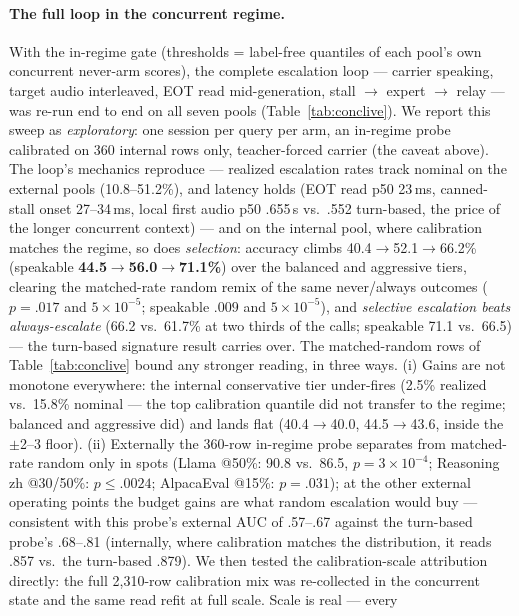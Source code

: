 \paragraph{The full loop in the concurrent regime.} With the
in-regime gate (thresholds = label-free quantiles of each pool's own
concurrent never-arm scores), the complete escalation loop --- carrier
speaking, target audio interleaved, EOT read mid-generation, stall $\to$
expert $\to$ relay --- was re-run end to end on all seven pools
(Table~\ref{tab:conclive}). We report this sweep as
\emph{exploratory}: one session per query per arm, an in-regime probe
calibrated on 360 internal rows only, teacher-forced carrier (the
caveat above). The loop's mechanics reproduce --- realized escalation
rates track nominal on the external pools (10.8--51.2\%), and latency
holds (EOT read p50 23\,ms, canned-stall onset 27--34\,ms, local
first audio p50 .655\,s vs.\ .552 turn-based, the price of the longer
concurrent context) --- and on the internal pool, where calibration
matches the regime, so does \emph{selection}: accuracy climbs
40.4$\to$52.1$\to$66.2\% (speakable
\textbf{44.5$\to$56.0$\to$71.1\%}) over the balanced and aggressive
tiers, clearing the matched-rate random remix of the same
never/always outcomes ($p{=}.017$ and $5{\times}10^{-5}$; speakable
$.009$ and $5{\times}10^{-5}$), and \emph{selective escalation beats
always-escalate} (66.2 vs.\ 61.7\% at two thirds of the calls;
speakable 71.1 vs.\ 66.5) --- the turn-based signature result
carries over. The matched-random rows of Table~\ref{tab:conclive}
bound any stronger reading, in three ways. (i) Gains are not monotone
everywhere: the internal conservative tier under-fires (2.5\%
realized vs.\ 15.8\% nominal --- the top calibration quantile did not
transfer to the regime; balanced and aggressive did) and lands flat
(40.4$\to$40.0, 44.5$\to$43.6, inside the $\pm$2--3 floor). (ii)
Externally the 360-row in-regime probe separates from matched-rate
random only in spots (Llama @50\%: 90.8 vs.\ 86.5,
$p{=}3{\times}10^{-4}$; Reasoning zh @30/50\%: $p\le.0024$;
AlpacaEval @15\%: $p{=}.031$); at the other external operating points
the budget gains are what random escalation would buy --- consistent
with this probe's external AUC of .57--.67 against the turn-based
probe's .68--.81 (internally, where calibration matches the
distribution, it reads .857 vs.\ the turn-based .879). We then
tested the calibration-scale attribution directly: the full
2{,}310-row calibration mix was re-collected in the concurrent state
and the same read refit at full scale. Scale is real --- every
